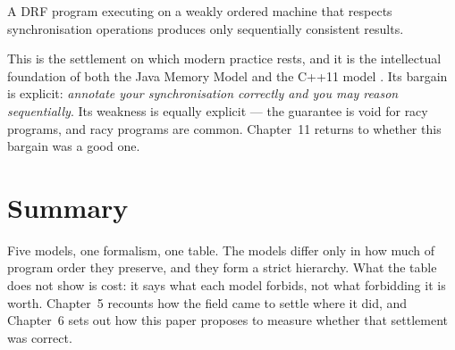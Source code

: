 \begin{theorem}
A DRF program executing on a weakly ordered machine that respects
synchronisation operations produces only sequentially consistent results.
\end{theorem}

This is the settlement on which modern practice rests, and it is the intellectual
foundation of both the Java Memory Model \cite{manson2005java} and the C++11
model \cite{boehm2008foundations}.
Its bargain is explicit: \emph{annotate your
synchronisation correctly and you may reason sequentially}.
Its weakness is
equally explicit --- the guarantee is void for racy programs, and racy programs
are common.
Chapter~11 returns to whether this bargain was a good one.

\section{Summary}

Five models, one formalism, one table.
The models differ only in how much of
program order they preserve, and they form a strict hierarchy.
What the table does
not show is cost: it says what each model forbids, not what forbidding it is worth.
Chapter~5 recounts how the field came to settle where it did, and Chapter~6 sets
out how this paper proposes to measure whether that settlement was correct.
